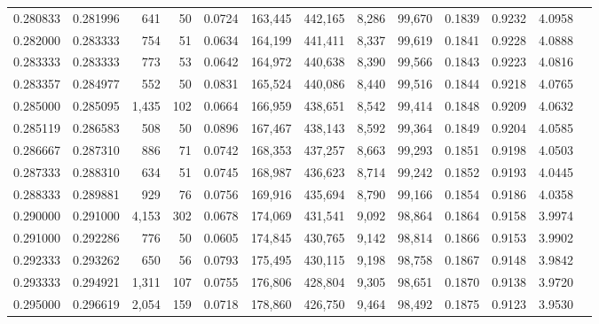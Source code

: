\begin{tabular}{rrrrrrrrrrrrr}
0.280833 & 0.281996 &   641 &  50 &                                     0.0724 & 163,445 & 442,165 &   8,286 &  99,670 & 0.1839 & 0.9232 & 4.0958 \\
0.282000 & 0.283333 &   754 &  51 &                                     0.0634 & 164,199 & 441,411 &   8,337 &  99,619 & 0.1841 & 0.9228 & 4.0888 \\
0.283333 & 0.283333 &   773 &  53 &                                     0.0642 & 164,972 & 440,638 &   8,390 &  99,566 & 0.1843 & 0.9223 & 4.0816 \\
0.283357 & 0.284977 &   552 &  50 &                                     0.0831 & 165,524 & 440,086 &   8,440 &  99,516 & 0.1844 & 0.9218 & 4.0765 \\
0.285000 & 0.285095 & 1,435 & 102 &                                     0.0664 & 166,959 & 438,651 &   8,542 &  99,414 & 0.1848 & 0.9209 & 4.0632 \\
0.285119 & 0.286583 &   508 &  50 &                                     0.0896 & 167,467 & 438,143 &   8,592 &  99,364 & 0.1849 & 0.9204 & 4.0585 \\
0.286667 & 0.287310 &   886 &  71 &                                     0.0742 & 168,353 & 437,257 &   8,663 &  99,293 & 0.1851 & 0.9198 & 4.0503 \\
0.287333 & 0.288310 &   634 &  51 &                                     0.0745 & 168,987 & 436,623 &   8,714 &  99,242 & 0.1852 & 0.9193 & 4.0445 \\
0.288333 & 0.289881 &   929 &  76 &                                     0.0756 & 169,916 & 435,694 &   8,790 &  99,166 & 0.1854 & 0.9186 & 4.0358 \\
0.290000 & 0.291000 & 4,153 & 302 &                                     0.0678 & 174,069 & 431,541 &   9,092 &  98,864 & 0.1864 & 0.9158 & 3.9974 \\
0.291000 & 0.292286 &   776 &  50 &                                     0.0605 & 174,845 & 430,765 &   9,142 &  98,814 & 0.1866 & 0.9153 & 3.9902 \\
0.292333 & 0.293262 &   650 &  56 &                                     0.0793 & 175,495 & 430,115 &   9,198 &  98,758 & 0.1867 & 0.9148 & 3.9842 \\
0.293333 & 0.294921 & 1,311 & 107 &                                     0.0755 & 176,806 & 428,804 &   9,305 &  98,651 & 0.1870 & 0.9138 & 3.9720 \\
0.295000 & 0.296619 & 2,054 & 159 &                                     0.0718 & 178,860 & 426,750 &   9,464 &  98,492 & 0.1875 & 0.9123 & 3.9530 \\

\end{tabular}
